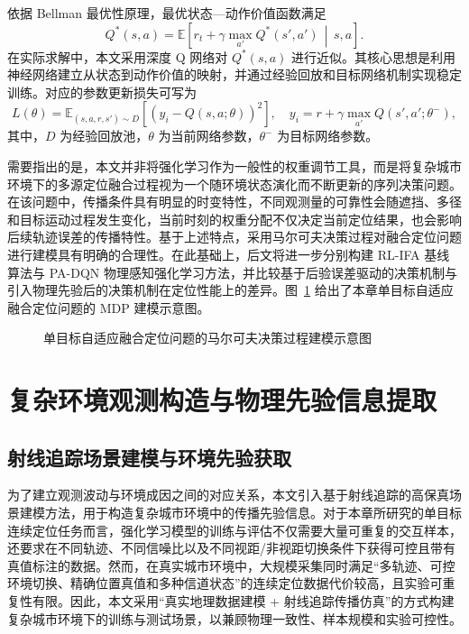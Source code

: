 依据 Bellman 最优性原理，最优状态—动作价值函数满足
\begin{equation}
Q^*(s,a)
=
\mathbb{E}
\left[
r_t+\gamma \max_{a'}Q^*(s',a')
\,\middle|\,
s,a
\right].
\label{eq:3_5_bellman}
\end{equation}
在实际求解中，本文采用深度 Q 网络对 \(Q^*(s,a)\) 进行近似。其核心思想是利用神经网络建立从状态到动作价值的映射，并通过经验回放和目标网络机制实现稳定训练。对应的参数更新损失可写为
\begin{equation}
L(\theta)
=
\mathbb{E}_{(s,a,r,s')\sim D}
\left[
\left(
y_i-Q(s,a;\theta)
\right)^2
\right],
\quad
y_i=r+\gamma\max_{a'}Q(s',a';\theta^-),
\label{eq:3_6_dqn_loss}
\end{equation}
其中，\(D\) 为经验回放池，\(\theta\) 为当前网络参数，\(\theta^-\) 为目标网络参数。

需要指出的是，本文并非将强化学习作为一般性的权重调节工具，而是将复杂城市环境下的多源定位融合过程视为一个随环境状态演化而不断更新的序列决策问题。在该问题中，传播条件具有明显的时变特性，不同观测量的可靠性会随遮挡、多径和目标运动过程发生变化，当前时刻的权重分配不仅决定当前定位结果，也会影响后续轨迹误差的传播特性。基于上述特点，采用马尔可夫决策过程对融合定位问题进行建模具有明确的合理性。在此基础上，后文将进一步分别构建 RL-IFA 基线算法与 PA-DQN 物理感知强化学习方法，并比较基于后验误差驱动的决策机制与引入物理先验后的决策机制在定位性能上的差异。图~\ref{fig:mdp_modeling_framework} 给出了本章单目标自适应融合定位问题的 MDP 建模示意图。

\begin{figure}[htbp]
    \centering
    \vspace{4.2cm}
    \caption{单目标自适应融合定位问题的马尔可夫决策过程建模示意图}
    \label{fig:mdp_modeling_framework}
\end{figure}

\section{复杂环境观测构造与物理先验信息提取}
\label{sec:3_2}

\subsection{射线追踪场景建模与环境先验获取}
\label{subsec:3_2_1}

为了建立观测波动与环境成因之间的对应关系，本文引入基于射线追踪的高保真场景建模方法，用于构造复杂城市环境中的传播先验信息。对于本章所研究的单目标连续定位任务而言，强化学习模型的训练与评估不仅需要大量可重复的交互样本，还要求在不同轨迹、不同信噪比以及不同视距/非视距切换条件下获得可控且带有真值标注的数据。然而，在真实城市环境中，大规模采集同时满足“多轨迹、可控环境切换、精确位置真值和多种信道状态”的连续定位数据代价较高，且实验可重复性有限。因此，本文采用“真实地理数据建模 + 射线追踪传播仿真”的方式构建复杂城市环境下的训练与测试场景，以兼顾物理一致性、样本规模和实验可控性。

